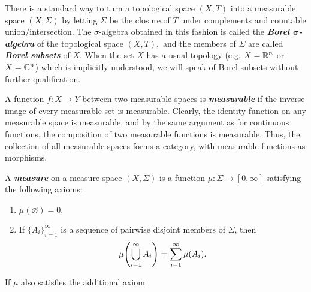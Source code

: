 \documentclass{article}
\begin{document}
There is a standard way to turn a topological space $(X, T)$ into a measurable space $(X, \Sigma)$ by letting $\Sigma$ be the closure of $T$ under complements and countable union/intersection. The $\sigma$-algebra obtained in this fashion is called the \textbf{\emph{Borel $\bm{\sigma}$-algebra}} of the topological space $(X, T),$ and the members of $\Sigma$ are called \textbf{\emph{Borel subsets}} of $X.$ When the set $X$ has a usual topology (e.g. $X = \mathbb{R}^n$ or $X = \mathbb{C}^n$) which is implicitly understood, we will speak of Borel subsets without further qualification.%

A function $f: X \to Y$ between two measurable spaces is \textbf{\emph{measurable}} if the inverse image of every measurable set is measurable. Clearly, the identity function on any measurable space is measurable, and by the same argument as for continuous functions, the composition of two measurable functions is measurable. Thus, the collection of all measurable spaces forms a category, with measurable functions as morphisms.%

A \textbf{\emph{measure}} on a measure space $(X, \Sigma)$ is a function $\mu: \Sigma \to [0, \infty]$ satisfying the following axioms:%

\begin{enumerate}[noitemsep,topsep=\mdcompacttopsep]%

\item{}$\mu(\varnothing) = 0.$%

\item{}If $\{A_i\}_{i=1}^\infty$ is a sequence of pairwise disjoint members of $\Sigma$, then
\noindent\noindent\[%
\mu\qty(\bigcup_{i=1}^\infty A_i) = \sum_{i=1}^\infty \mu(A_i).
\]%
\end{enumerate}%

\noindent{}If $\mu$ also satisfies the additional axiom%
\end{document}
